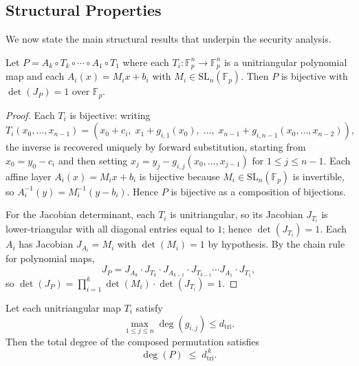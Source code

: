 ﻿\documentclass[english]{aucmcs}
\newcommand{\Fp}{\mathbb{F}_p}
\begin{document}
\subsection{Structural Properties}
\label{sec:structural-properties}

We now state the main structural results that underpin the security analysis.

\begin{theorem}
\label{thm:bijectivity}
Let $P = A_k \circ T_k \circ \cdots \circ A_1 \circ T_1$ where each
$T_i : \Fp^n \to \Fp^n$ is a unitriangular polynomial map and each
$A_i(x) = M_i x + b_i$ with $M_i \in \mathrm{SL}_n(\Fp)$.
Then $P$ is bijective with $\det(J_P) = 1$ over $\Fp$.
\end{theorem}

\begin{proof}
Each $T_i$ is bijective: writing
\[
  T_i(x_0, \dots, x_{n-1}) = (x_0 + c_i,\; x_1 + g_{i,1}(x_0),\; \dots,\; x_{n-1} + g_{i,n-1}(x_0, \dots, x_{n-2})),
\]
the inverse is recovered uniquely by forward substitution, starting from
$x_0 = y_0 - c_i$ and then setting
$x_j = y_j - g_{i,j}(x_0, \dots, x_{j-1})$ for $1 \le j \le n-1$.
Each affine layer $A_i(x) = M_i x + b_i$ is bijective because
$M_i \in \mathrm{SL}_n(\Fp)$ is invertible, so
$A_i^{-1}(y) = M_i^{-1}(y - b_i)$.
Hence $P$ is bijective as a composition of bijections.

For the Jacobian determinant, each $T_i$ is unitriangular, so its Jacobian
$J_{T_i}$ is lower-triangular with all diagonal entries equal to $1$; hence
$\det(J_{T_i}) = 1$. Each $A_i$ has Jacobian $J_{A_i} = M_i$ with
$\det(M_i) = 1$ by hypothesis. By the chain rule for polynomial maps,
\[
  J_P = J_{A_k} \cdot J_{T_k} \cdot J_{A_{k-1}} \cdot J_{T_{k-1}}
        \cdots J_{A_1} \cdot J_{T_1},
\]
so $\det(J_P) = \prod_{i=1}^{k} \det(M_i) \cdot \det(J_{T_i}) = 1$.
\end{proof}


\begin{theorem}
\label{thm:degree-growth}
Let each unitriangular map $T_i$ satisfy
\[
\max_{1 \le j \le n} \deg(g_{i,j}) \le d_{\mathrm{tri}}.
\]
Then the total degree of the composed permutation satisfies
\[
  \deg(P) \;\le\; d_{\mathrm{tri}}^{\,k}.
\]
\end{theorem}
\end{document}
